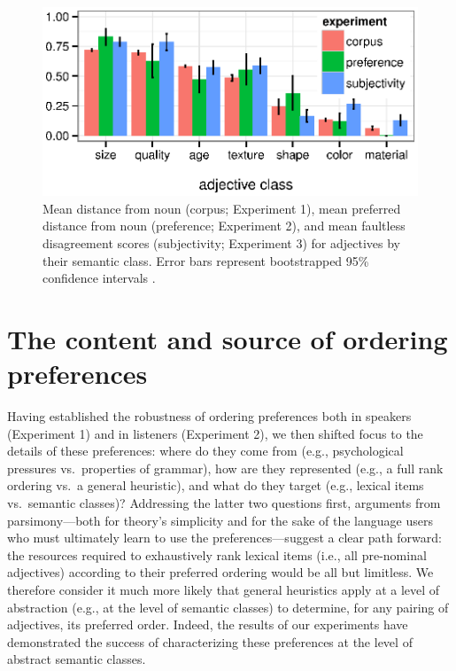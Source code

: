 \documentclass{pnastwo}
\begin{document}
\begin{article}
\begin{figure}[h]
	\centering
	\includegraphics[width=\linewidth]{plots/expt_results.eps}
	\vspace{-10pt}
\caption{Mean distance from noun (corpus; Experiment 1), mean preferred distance from noun  (preference; Experiment 2), and mean faultless disagreement scores (subjectivity; Experiment 3) for adjectives by their semantic class. Error bars represent bootstrapped 95\% confidence intervals \cite{diciccioefron1996}.}\label{results}
\end{figure}

\section{The content and source of ordering preferences}

Having established the robustness of ordering preferences both in speakers (Experiment 1) and in listeners (Experiment 2), we then shifted focus to the details of these preferences: where do they come from (e.g., psychological pressures vs.~properties of grammar), how are they represented (e.g., a full rank ordering vs.~a general heuristic), and what do they target (e.g., lexical items vs.~semantic classes)? Addressing the latter two questions first, arguments from parsimony---both for theory's simplicity and for the sake of the language users who must ultimately learn to use the preferences---suggest a clear path forward: the resources required to exhaustively rank lexical items (i.e., all pre-nominal adjectives) according to their preferred ordering would be all but limitless. We therefore consider it much more likely that general heuristics apply at a level of abstraction (e.g., at the level of semantic classes) to determine, for any pairing of adjectives, its preferred order.  Indeed, the results of our experiments have demonstrated the success of characterizing these preferences at the level of abstract semantic classes.


\end{article}
\end{document}
